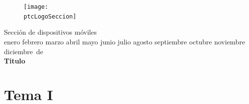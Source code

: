 \documentclass[a4paper,12pt]{article}
\newcommand{\MONTH}{%
  \ifcase\the\month
  \or enero%
  \or febrero%
  \or marzo%
  \or abril%
  \or mayo%
  \or junio%
  \or julio%
  \or agosto%
  \or septiembre%
  \or octubre%
  \or noviembre%
  \or diciembre%
  \fi
}
\newcommand{\protecoTitle}{
  \begin{minipage}[t]{0.6\textwidth}
    \vspace{0.1cm}
    \Large{\ptcSeccion}\\
    \MONTH\,de\,\the\year\\
    \textbf{\LARGE{\ptcTitulo}}\\
  \end{minipage}

}
\newcommand{\putLogo}{
  \begin{figure} %
      \centering
      \vspace{0.1cm}
      \texttt{[image: \\ptcLogoSeccion]}
      \vspace{-110pt} %
  \end{figure}
}
\begin{document}

\graphicspath{{latex/assets/}}

\newcommand{\ptcSeccion}{Sección de dispositivos móviles}
\newcommand{\ptcTitulo}{Titulo}
\newcommand{\ptcLogoSeccion}{smartphone}

\putLogo
\protecoTitle


\section{Tema I}
\selectfont

\end{document}
